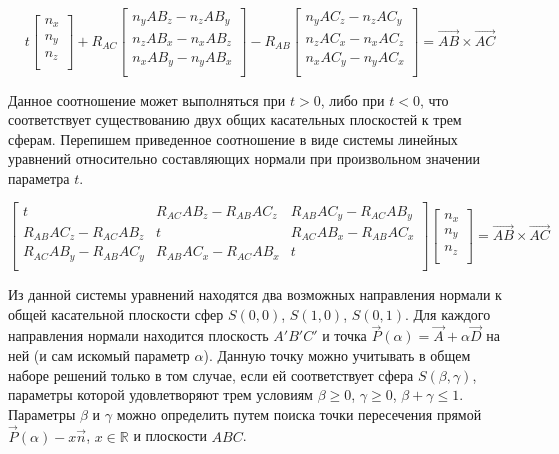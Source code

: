 \documentclass[
11pt,%
tightenlines,%
twoside,%
onecolumn,%
nofloats,%
nobibnotes,%
nofootinbib,%
superscriptaddress,%
noshowpacs,%
centertags]%
{revtex4}
\begin{document}
\begin{equation}
t
\left[ { \begin{array}{c}
            n_x \\
            n_y \\
            n_z \\
         \end{array} } \right]
+ R_{AC}
\left[ { \begin{array}{c}
            n_y AB_z - n_z AB_y  \\
            n_z AB_x - n_x AB_z \\
            n_x AB_y - n_y AB_x \\
         \end{array} } \right]
- R_{AB}
\left[ { \begin{array}{c}
            n_y AC_z - n_z AC_y \\
            n_z AC_x - n_x AC_z \\
            n_x AC_y - n_y AC_x \\
         \end{array} } \right]
= \vec{AB} \times \vec{AC}
\end{equation}

Данное соотношение может выполняться при $t > 0$, либо при $t < 0$, что соответствует существованию двух общих касательных плоскостей к трем сферам.
Перепишем приведенное соотношение в виде системы линейных уравнений относительно составляющих нормали при произвольном значении параметра $t$.

\begin{equation}
\left[ { \begin{array}{ccc}
             t & R_{AC} AB_z - R_{AB} AC_z & R_{AB} AC_y - R_{AC} AB_y \\
             R_{AB} AC_z - R_{AC} AB_z & t & R_{AC} AB_x - R_{AB} AC_x \\
             R_{AC} AB_y - R_{AB} AC_y & R_{AB} AC_x - R_{AC} AB_x & t \\
         \end{array} } \right]
\left[ { \begin{array}{c}
            n_x \\
            n_y \\
            n_z \\
         \end{array} } \right]
= \vec{AB} \times \vec{AC}
\end{equation}

Из данной системы уравнений находятся два возможных направления нормали к общей касательной плоскости сфер $S(0,0)$, $S(1,0)$, $S(0, 1)$.
Для каждого направления нормали находится плоскость $A'B'C'$ и точка $\vec{P}(\alpha) = \vec{A} + \alpha \vec{D}$ на ней (и сам искомый параметр $\alpha$).
Данную точку можно учитывать в общем наборе решений только в том случае, если ей соответствует сфера $S(\beta, \gamma)$, параметры которой удовлетворяют трем условиям $\beta \ge 0$, $\gamma \ge 0$, $\beta + \gamma \le 1$.
Параметры $\beta$ и $\gamma$ можно определить путем поиска точки пересечения прямой $\vec{P}(\alpha) - x \vec{n}$, $x \in \mathbb{R}$ и плоскости $ABC$.
\end{document}
